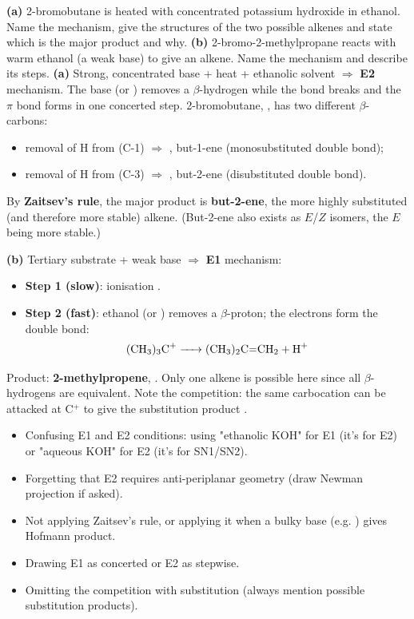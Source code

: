 \documentclass[11pt]{article}
\begin{document}
\begin{exoresolu}
\textbf{(a)} 2-bromobutane is heated with concentrated potassium hydroxide in ethanol. Name the mechanism, give the structures of the two possible alkenes and state which is the major product and why. \textbf{(b)} 2-bromo-2-methylpropane reacts with warm ethanol (a weak base) to give an alkene. Name the mechanism and describe its steps.
\tcblower
\textbf{(a)} Strong, concentrated base + heat + ethanolic solvent $\Rightarrow$ \textbf{E2} mechanism. The base  (or ) removes a $\beta$-hydrogen while the  bond breaks and the $\pi$ bond forms in one concerted step. 2-bromobutane, , has two different $\beta$-carbons:
\begin{itemize}
\item removal of H from  (C-1) $\Rightarrow$ , but-1-ene (monosubstituted double bond);
\item removal of H from  (C-3) $\Rightarrow$ , but-2-ene (disubstituted double bond).
\end{itemize}
By \textbf{Zaitsev's rule}, the major product is \textbf{but-2-ene}, the more highly substituted (and therefore more stable) alkene. (But-2-ene also exists as $E$/$Z$ isomers, the $E$ being more stable.)

\textbf{(b)} Tertiary substrate + weak base $\Rightarrow$ \textbf{E1} mechanism:
\begin{itemize}
\item \textbf{Step 1 (slow)}: ionisation .
\item \textbf{Step 2 (fast)}: ethanol (or ) removes a $\beta$-proton; the  electrons form the double bond:
\[ \ce{(CH3)3C+ -> (CH3)2C=CH2 + H+} \]
\end{itemize}
Product: \textbf{2-methylpropene}, . Only one alkene is possible here since all $\beta$-hydrogens are equivalent. Note the competition: the same carbocation can be attacked at C$^+$ to give the substitution product .
\end{exoresolu}

\begin{attention}
\begin{itemize}
\item Confusing E1 and E2 conditions: using "ethanolic KOH" for E1 (it's for E2) or "aqueous KOH" for E2 (it's for SN1/SN2).
\item Forgetting that E2 requires anti-periplanar geometry (draw Newman projection if asked).
\item Not applying Zaitsev's rule, or applying it when a bulky base (e.g. ) gives Hofmann product.
\item Drawing E1 as concerted or E2 as stepwise.
\item Omitting the competition with substitution (always mention possible substitution products).
\end{itemize}
\end{attention}
\end{document}
